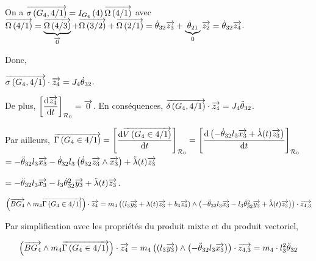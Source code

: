 \documentclass[10pt,fleqn]{article} %
\begin{document}
On a $\overrightarrow{\sigma \left( {G_4}, {4} /{1}\right)} =I_{G_4}\left( 4\right) \overrightarrow{\Omega\left( {4}/{1}\right)}$ avec $\overrightarrow{\Omega\left( {4}/{1}\right)}=\underbrace{\overrightarrow{\Omega\left( {4}/{3}\right)}}_{\overrightarrow{0}}+\overrightarrow{\Omega\left( {3}/{2}\right)}+\overrightarrow{\Omega\left( {2}/{1}\right)} =\dot{\theta}_{32} \overrightarrow{z_3}+\underbrace{\dot{\theta}_{21}}_{0} \overrightarrow{z_2}=\dot{\theta}_{32} \overrightarrow{z_4}$.

Donc,

$\overrightarrow{\sigma \left( {G_4}, {4} /{1}\right)}\cdot\overrightarrow{z_4}=J_4\dot{\theta}_{32} $.

De plus, $ \left[ \dfrac{ \text{d} \overrightarrow{z_4}}{\text{d} t} \right]_{\mathcal{R}_{0}} = \overrightarrow{0} $. 
En conséquences, $\overrightarrow{\delta \left( {G_4}, {4} /{1}\right)} \cdot\overrightarrow{z_4}  = J_4\ddot{\theta}_{32}$.

Par ailleurs, $\overrightarrow{\Gamma \left( {G_4} \in {4}/{1}\right)}= \left[\dfrac{\text{d} \overrightarrow{V\left( {G_4} \in {4}/{1}\right)}}{\text{d} t} \right]_{\mathcal{R}_{0}}=\left[\dfrac{\text{d} \left( -\dot{\theta}_{32}l_3\overrightarrow{x_3}  + \dot{\lambda}(t)\overrightarrow{z_3} \right)}{\text{d} t} \right]_{\mathcal{R}_{0}}$
$= -\ddot{\theta}_{32}l_3\overrightarrow{x_3} -\dot{\theta}_{32}l_3    \left(\dot{\theta}_{32} \overrightarrow{z_3}\wedge \overrightarrow{x_3} \right)  + \ddot{\lambda}(t)\overrightarrow{z_3}  $

$= -\ddot{\theta}_{32}l_3\overrightarrow{x_3} -l_3   \dot{\theta}_{32}^2  \overrightarrow{y_3} + \ddot{\lambda}(t)\overrightarrow{z_3}  $.

$\left(\overrightarrow{BG_4}\wedge m_4 \overrightarrow{\Gamma \left( {G_4} \in {4}/{1}\right)}\right)\cdot\overrightarrow{z_4} = 
m_4\left( \left(l_3 \overrightarrow{y_3} + \lambda(t) \overrightarrow{z_3}+ b_4 \overrightarrow{z_4}\right) \wedge  \left(-\ddot{\theta}_{32}l_3\overrightarrow{x_3} -l_3   \dot{\theta}_{32}^2  \overrightarrow{y_3} + \ddot{\lambda}(t)\overrightarrow{z_3} \right) \right)\cdot \overrightarrow{z_{4,3}}$

Par simplification avec les propriétés du produit mixte et du produit vectoriel,

\begin{align*}
\left(\overrightarrow{BG_4}\wedge m_4 \overrightarrow{\Gamma \left( {G_4} \in {4}/{1}\right)}\right)\cdot\overrightarrow{z_4} =
m_4\left( \left(l_3 \overrightarrow{y_3} \right) \wedge  \left(-\ddot{\theta}_{32}l_3\overrightarrow{x_3} \right) \right)\cdot \overrightarrow{z_{4,3}}
=m_4\cdot l_3^2\ddot{\theta}_{32}
\end{align*}
\end{document}
